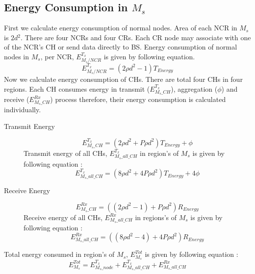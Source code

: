 \documentclass[3p,times,procedia]{elsarticle}
\begin{document}
\subsection{Energy Consumption in $M_{s}$}
First we calculate energy consumption of normal nodes. Area of each NCR in $M_{s}$ is $2d{^2}$. There are four NCRs and four CRs. Each CR node may associate with one of the NCR's CH or send data directly to BS. Energy consumption of normal nodes in $M_{s}$, per NCR, $E^{T_{x}}_{M_{s}/NCR}$ is given by following equation.
\begin{equation}
  E^{T_{x}}_{M_{s}/NCR} = (2\rho  d^{2}-1)T_{Energy}
\end{equation}
Now we calculate energy consumption of CHs. There are total four CHs in four regions. Each CH consumes energy in transmit ($E^{T_{x}}_{M_{s}\_CH}$), aggregation ($\phi$) and receive ($E^{Rx}_{M_{s}\_CH}$) process therefore, their energy consumption is calculated individually.
\begin{description}
  \item[Transmit Energy]
    \begin{equation}\label{Transmit Energy}
     E^{T_{x}}_{M_{s}\_CH} = (2\rho  d^{2} + P\rho d^{2})T_{Energy} + \phi
    \end{equation}
  Transmit energy of all CHs, $E^{T_{x}}_{M_{s}\_all\_CH}$ in region's of $M_s$ is given by following equation :
    \begin{equation}
     E^{T_{x}}_{M_{s}\_all\_CH} = (8\rho  d^{2} + 4P\rho d^{2})T_{Energy} + 4\phi
    \end{equation}

  \item[Receive Energy]
   \begin{equation}
     E^{Rx}_{M_{s}\_CH} = ((2\rho  d^{2} -1) + P\rho d^{2}) R_{Energy}
   \end{equation}
   Receive energy of all CHs, $E^{Rx}_{M_{s}\_all\_CH}$ in regions's of $M_s$ is given by following equation :
    \begin{equation}
         E^{Rx}_{M_{s}\_all\_CH} = ((8\rho  d^{2} -4) + 4P\rho d^{2})R_{Energy}
    \end{equation}

\end{description}
Total energy consumed in region's of $M_s$, $E^{Tot}_{M_{s}}$ is given by following equation :
\begin{equation}
  E^{Tot}_{M_{s}} = E^{T_{x}}_{M_{s}\_node} + E^{T_{x}}_{M_{s}\_all\_CH} + E^{Rx}_{M_{s}\_all\_CH}
\end{equation}
\end{document}

